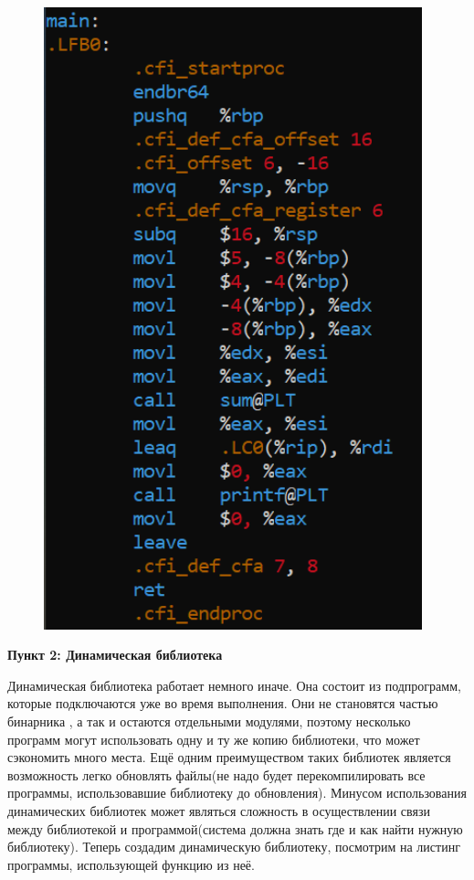 \documentclass[a4paper,12pt]{article}
\begin{document}
\begin{figure}[H]
{\begin{minipage}[t]{0.4\textwidth}
        \includegraphics[width = 0.976\textwidth]{Листинг со стат библ 64.png}
    \end{minipage}}
\end{figure}

\textbf{Пункт 2: Динамическая библиотека}

Динамическая библиотека работает немного иначе. Она состоит из подпрограмм, которые подключаются уже во время выполнения. Они не становятся частью бинарника , а так и остаются отдельными модулями, поэтому несколько программ могут использовать одну и ту же копию библиотеки, что может сэкономить много места. Ещё одним преимуществом таких библиотек является возможность легко обновлять файлы(не надо будет перекомпилировать все программы, использовавшие библиотеку до обновления). Минусом использования динамических библиотек может являться сложность в осуществлении связи между библиотекой и программой(система должна знать где и как найти нужную библиотеку). Теперь создадим динамическую библиотеку, посмотрим на листинг программы, использующей функцию из неё.
\end{document}
